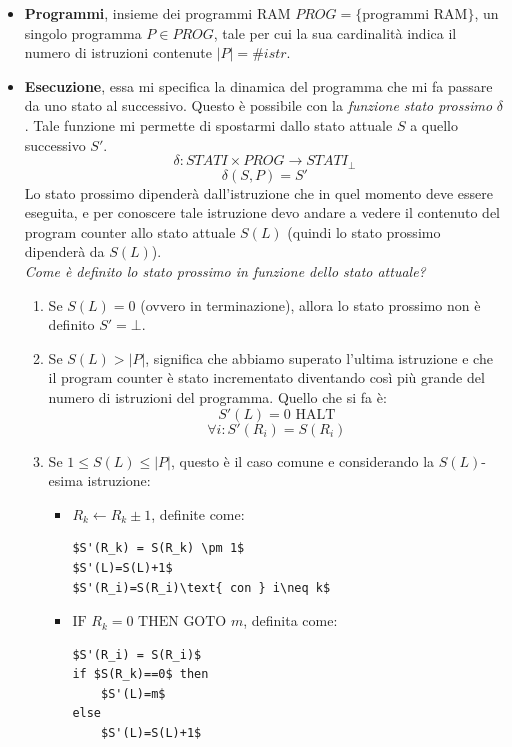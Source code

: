 \documentclass{article}
\begin{document}
\begin{itemize}
    \item \textbf{Programmi}, insieme dei programmi RAM $PROG=\{\text{programmi RAM}\}$, un
          singolo programma $P\in PROG$, tale per cui la sua cardinalità indica
          il numero di istruzioni contenute $|P| = \#istr$.
    \item \textbf{Esecuzione}, essa mi specifica la dinamica del programma che mi fa
          passare da uno stato al successivo. Questo è possibile con la \textit{funzione
              stato prossimo} $\delta$. Tale funzione mi permette di spostarmi dallo stato attuale
          $S$ a quello successivo $S'$.
          $$\delta:STATI\times PROG \rightarrow STATI_\bot$$
          $$\delta(S,P)=S'$$
          Lo stato prossimo dipenderà dall'istruzione che in quel momento deve essere eseguita,
          e per conoscere tale istruzione devo andare a vedere il contenuto del program counter
          allo stato attuale $S(L)$ (quindi lo stato prossimo dipenderà da $S(L)$).\\\textit{Come
              è definito lo stato prossimo in funzione dello stato attuale?}
          \begin{enumerate}
              \item Se $S(L)=0$ (ovvero in terminazione), allora lo stato prossimo non è definito
                    $S'=\bot$.
              \item Se $S(L)>|P|$, significa che abbiamo superato l'ultima istruzione
                    e che il program counter è stato incrementato diventando così più
                    grande del numero di istruzioni del programma. Quello che si fa è:
                    $$S'(L)=0\text{ HALT}$$
                    $$\forall i:S'(R_i)=S(R_i)$$
              \item Se $1\leq S(L)\leq |P|$, questo è il caso comune e considerando
                    la $S(L)$-esima istruzione:
                    \begin{itemize}
                        \item $R_k\leftarrow R_k \pm 1$, definite come:
                              \begin{lstlisting}[mathescape=true]
$S'(R_k) = S(R_k) \pm 1$
$S'(L)=S(L)+1$
$S'(R_i)=S(R_i)\text{ con } i\neq k$
                        \end{lstlisting}
                        \item $\text{IF }R_k=0\text{ THEN GOTO }m$, definita come:
                              \begin{lstlisting}[mathescape]
$S'(R_i) = S(R_i)$
if $S(R_k)==0$ then
    $S'(L)=m$
else
    $S'(L)=S(L)+1$
                        \end{lstlisting}
                    \end{itemize}
          \end{enumerate}

\end{itemize}
\end{document}

